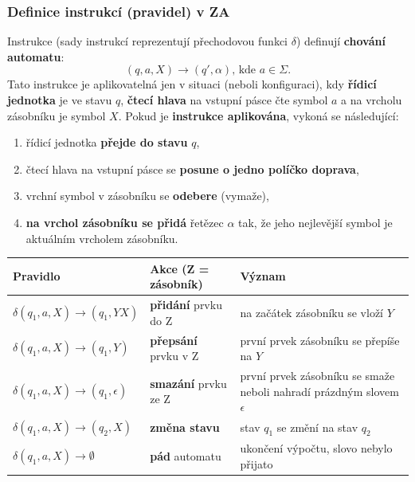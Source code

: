 \subsubsection{Definice instrukcí (pravidel) v ZA}
Instrukce (sady instrukcí reprezentují přechodovou funkci $\delta$) definují \textbf{chování automatu}:
\begin{equation}
(q, a, X) \rightarrow (q', \alpha)\textrm{, kde } a\in \Sigma.
\end{equation}
Tato instrukce je aplikovatelná jen v situaci (neboli konfiguraci), kdy \textbf{řídicí jednotka} je ve stavu $q$, \textbf{čtecí hlava} na vstupní pásce čte symbol $a$ a na vrcholu zásobníku je symbol $X$. Pokud je \textbf{instrukce aplikována}, vykoná se následující:
\begin{enumerate}
\item řídicí jednotka \textbf{přejde do stavu} $q$,
\item čtecí hlava na vstupní pásce se \textbf{posune o jedno políčko doprava},
\item vrchní symbol v zásobníku se \textbf{odebere} (vymaže),
\item \textbf{na vrchol zásobníku se přidá} řetězec $\alpha$ tak, že jeho nejlevější symbol je aktuálním vrcholem zásobníku.
\end{enumerate}

\begin{table}[H]
	\vspace{-2mm}
	\centering
	\begin{tabular}{|l|l|p{6.5cm}|}
		\hline
		\textbf{Pravidlo} & \textbf{Akce (Z = zásobník)} & \textbf{Význam} \\ \hline
		$ \delta(q_1, a, X) \rightarrow (q_1, YX) $ 	&                 \textbf{přidání} prvku do Z & na začátek zásobníku se vloží $Y$ \\ \hline
		$ \delta(q_1, a, X) \rightarrow (q_1, Y) $	&                  \textbf{přepsání} prvku v Z & první prvek zásobníku se přepíše na $Y$ \\ \hline
		$ \delta(q_1, a, X) \rightarrow (q_1, \epsilon) $	&                  \textbf{smazání} prvku ze Z & první prvek zásobníku se smaže neboli nahradí prázdným slovem $\epsilon$ \\ \hline
		$ \delta(q_1, a, X)\rightarrow(q_2, X) $	&                  \textbf{změna stavu}& stav $ q_1 $ se změní na stav $ q_2 $ \\ \hline
		$\delta(q_1, a, X)\rightarrow\emptyset$	&                  \textbf{pád} automatu & ukončení výpočtu, slovo nebylo přijato \\ \hline
	\end{tabular}
\end{table}

